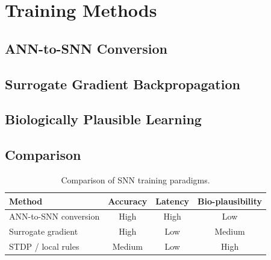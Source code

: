 \section{Training Methods}
\label{sec:training}


\subsection{ANN-to-SNN Conversion}

\subsection{Surrogate Gradient Backpropagation}

\subsection{Biologically Plausible Learning}

\subsection{Comparison}
\begin{table}[h]
  \centering
  \caption{Comparison of SNN training paradigms.}
  \label{tab:training}
  \begin{tabular}{@{}lccc@{}}
    \toprule
    Method & Accuracy & Latency & Bio-plausibility \\
    \midrule
    ANN-to-SNN conversion & High & High & Low \\
    Surrogate gradient     & High & Low  & Medium \\
    STDP / local rules     & Medium & Low & High \\
    \bottomrule
  \end{tabular}
\end{table}
